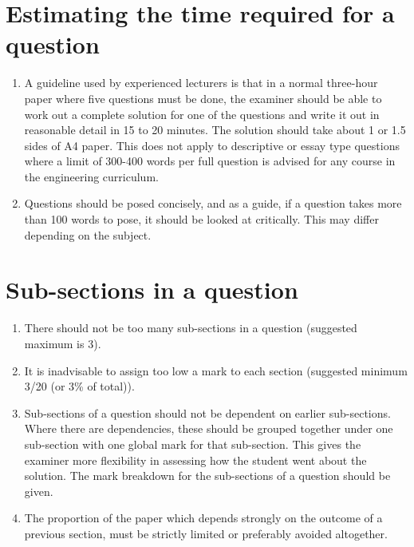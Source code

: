 \documentclass{ArcHandout}
\begin{document}
\section{Estimating the time required for a question}

\begin{enumerate}
  \item A guideline used by experienced lecturers is that in a normal
  three-hour paper where five questions must be done, the examiner should
  be able to work out a complete solution for one of the questions and write
  it out in reasonable detail in 15 to 20 minutes.  The solution should
  take about 1 or 1.5 sides of A4 paper. This does not apply to descriptive
  or essay type questions where a limit of 300-400 words per full question
  is advised for any course in the engineering curriculum.

  \item Questions should be posed concisely, and as a guide, if a question
  takes more than 100 words to pose, it should be looked at critically.
  This may differ depending on the subject.
\end{enumerate}

\section{Sub-sections in a question}
\begin{enumerate}
  \item There should not be too many sub-sections in a question (suggested
  maximum is 3).

  \item It is inadvisable to assign too low a mark to each section
  (suggested minimum 3/20 (or 3\% of total)).

  \item Sub-sections of a question should not be dependent on earlier
  sub-sections. Where there are dependencies, these should be grouped
  together under one sub-section with one global mark for that sub-section.
  This gives the examiner more flexibility in assessing how the student
  went about the solution. The mark breakdown for the sub-sections of a
  question should be given.

  \item The proportion of the paper which depends strongly on the outcome
  of a previous section, must be strictly limited or preferably avoided
  altogether.
\end{enumerate}
\end{document}
